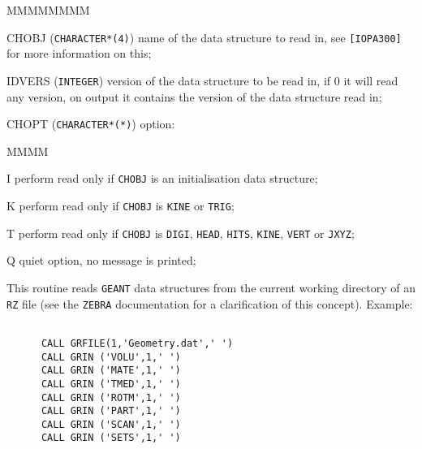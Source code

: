       
      

\begin{DLtt}{MMMMMMMM}
\item[CHOBJ] ({\tt CHARACTER*(4)}) name of the data structure to
read in, see {\tt [IOPA300]} for more information on this;
\item[IDVERS] ({\tt INTEGER}) version of the data structure to be read in,
if 0 it will read any version, on output it contains the version of the
data structure read in;
\item[CHOPT] ({\tt CHARACTER*(*)})  option:
\begin{DLtt}{MMMM}
\item[I] perform read only if
{\tt CHOBJ} is an initialisation data structure;
\item[K] perform read only if {\tt CHOBJ} is {\tt KINE} or {\tt TRIG};
\item[T] perform read only if {\tt CHOBJ} is 
{\tt DIGI}, {\tt HEAD}, {\tt HITS}, {\tt KINE},
{\tt VERT} or {\tt JXYZ};
\item[Q] quiet option, no message is printed;
\end{DLtt}
\end{DLtt}

This routine reads {\tt GEANT} data structures from the current working
directory of an {\tt RZ} file (see the {\tt ZEBRA} documentation for
a clarification of this concept). Example:
\begin{verbatim}

      CALL GRFILE(1,'Geometry.dat',' ')
      CALL GRIN ('VOLU',1,' ') 
      CALL GRIN ('MATE',1,' ')
      CALL GRIN ('TMED',1,' ')
      CALL GRIN ('ROTM',1,' ')
      CALL GRIN ('PART',1,' ')
      CALL GRIN ('SCAN',1,' ')
      CALL GRIN ('SETS',1,' ')
\end{verbatim}

